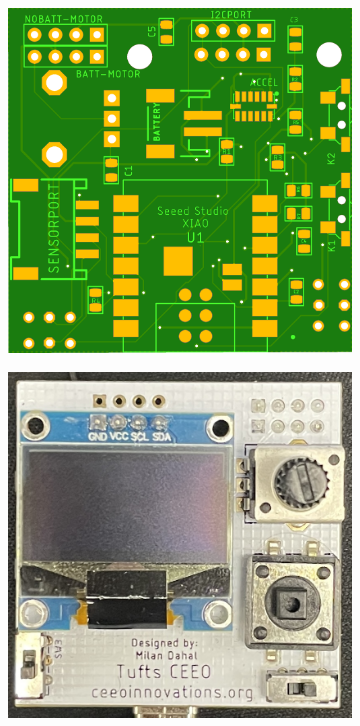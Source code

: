 \begin{figure}[H]
    \centering
    \begin{subfigure}[b]{0.25\textwidth}
        \includegraphics[width=\linewidth]{overleaf/images/pcb_sch.png}
    \end{subfigure}
    \hspace{10pt}
    \begin{subfigure}[b]{0.25\textwidth}
        \includegraphics[width=\linewidth]{overleaf/images/front.jpg}

\end{subfigure}
\end{figure}
